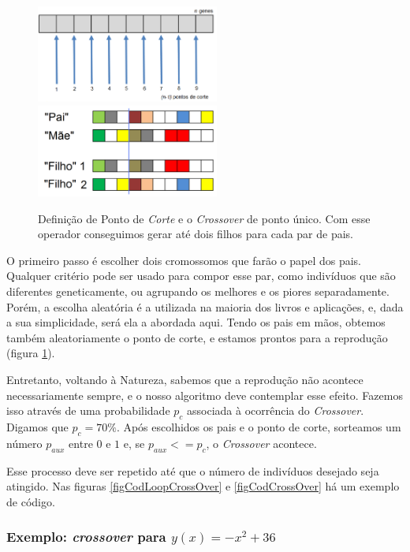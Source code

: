 	\begin{figure}[htp]
		\begin{center}
			\includegraphics[width=6cm]{figs/ga/PontosCorte.png}
			\includegraphics[width=6cm]{figs/ga/CrossOver.png}
		\end{center}
		\caption{\label{figCrossOver}Definição de Ponto de \textit{Corte} e o \textit{Crossover} de ponto único. Com esse operador conseguimos gerar até dois filhos para cada par de pais.}
	\end{figure}
	
	O primeiro passo é escolher dois cromossomos que farão o papel dos pais. Qualquer critério pode ser usado para compor esse par, como indivíduos que são diferentes geneticamente, ou agrupando os melhores e os piores separadamente. Porém, a escolha aleatória é a utilizada na maioria dos livros e aplicações, e, dada a sua simplicidade, será ela a abordada aqui. Tendo os pais em mãos, obtemos também aleatoriamente o ponto de corte, e estamos prontos para a reprodução (figura \ref{figCrossOver}). 
	
	Entretanto, voltando à Natureza, sabemos que a reprodução não acontece necessariamente sempre, e o nosso algoritmo deve contemplar esse efeito. Fazemos isso através de uma probabilidade $p_c$ associada à ocorrência do \textit{Crossover}. Digamos que $p_c = 70\%$. Após escolhidos os pais e o ponto de corte, sorteamos um número $p_{aux}$ entre $0$ e $1$ e, se $p_{aux} <= p_c$, o \textit{Crossover} acontece.
	
	Esse processo deve ser repetido até que o número de indivíduos desejado seja atingido. Nas figuras \ref{figCodLoopCrossOver} e \ref{figCodCrossOver} há um exemplo de código.
	
	\subsubsection{Exemplo: \emph{crossover} para $y(x) = -x^2 + 36$}
	
